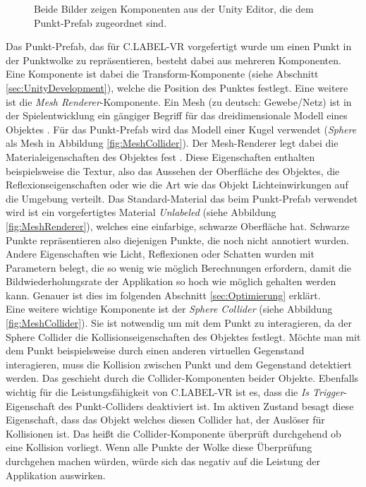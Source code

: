 \begin{figure}%
    \centering
    \qquad
    \caption{Beide Bilder zeigen Komponenten aus der Unity Editor, die dem Punkt-Prefab zugeordnet sind.}
    \label{fig:Components}%
\end{figure}


Das Punkt-Prefab, das für C.LABEL-VR vorgefertigt wurde um einen Punkt in der Punktwolke zu repräsentieren, besteht dabei aus mehreren Komponenten. Eine Komponente ist dabei die Transform-Komponente (siehe Abschnitt \ref{sec:UnityDevelopment}), welche die Position des Punktes festlegt. Eine weitere ist die \textit{Mesh Renderer}-Komponente. Ein Mesh (zu deutsch: Gewebe/Netz) ist in der Spielentwicklung ein gängiger Begriff für das dreidimensionale Modell eines Objektes \cite{bib:Meshes}. Für das Punkt-Prefab wird das Modell einer Kugel verwendet (\textit{Sphere} als Mesh in Abbildung \ref{fig:MeshCollider}). Der Mesh-Renderer legt dabei die Materialeigenschaften des Objektes fest \cite{bib:MeshRenderer}. Diese Eigenschaften enthalten beispielsweise die Textur, also das Aussehen der Oberfläche des Objektes, die Reflexionseigenschaften oder wie die Art wie das Objekt Lichteinwirkungen auf die Umgebung verteilt. Das Standard-Material das beim Punkt-Prefab verwendet wird ist ein vorgefertigtes Material \textit{Unlabeled} (siehe Abbildung \ref{fig:MeshRenderer}), welches eine einfarbige, schwarze Oberfläche hat. Schwarze Punkte repräsentieren also diejenigen Punkte, die noch nicht annotiert wurden. Andere Eigenschaften wie Licht, Reflexionen oder Schatten wurden mit Parametern belegt, die so wenig wie möglich Berechnungen erfordern, damit die Bildwiederholungsrate der Applikation so hoch wie möglich gehalten werden kann. Genauer ist dies im folgenden Abschnitt \ref{sec:Optimierung} erklärt. \\

Eine weitere wichtige Komponente ist der \textit{Sphere Collider} (siehe Abbildung \ref{fig:MeshCollider}). Sie ist notwendig um mit dem Punkt zu interagieren, da der Sphere Collider die Kollisionseigenschaften des Objektes festlegt. Möchte man mit dem Punkt beispielsweise durch einen anderen virtuellen Gegenstand interagieren, muss die Kollision zwischen Punkt und dem Gegenstand detektiert werden. Das geschieht durch die Collider-Komponenten beider Objekte. Ebenfalls wichtig für die Leistungsfähigkeit von C.LABEL-VR ist es, dass die \textit{Is Trigger}-Eigenschaft des Punkt-Colliders deaktiviert ist. Im aktiven Zustand besagt diese Eigenschaft, dass das Objekt welches diesen Collider hat, der Auslöser für Kollisionen ist. Das heißt die Collider-Komponente überprüft durchgehend ob eine Kollision vorliegt. Wenn alle Punkte der Wolke diese Überprüfung durchgehen machen würden, würde sich das negativ auf die Leistung der Applikation auswirken.\\

